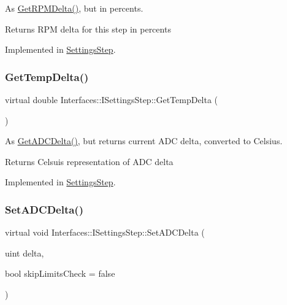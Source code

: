 As \hyperlink{class_interfaces_1_1_i_settings_step_ace758dafae2a6bcbb0b1a3a64c802e3c}{Get\+R\+P\+M\+Delta()}, but in percents. 

\begin{DoxyReturn}{Returns}
R\+PM delta for this step in percents 
\end{DoxyReturn}


Implemented in \hyperlink{class_settings_step_ada359fe4bfdaf271e621ec2943c0644c}{Settings\+Step}.

\mbox{\label{class_interfaces_1_1_i_settings_step_a7dd93517fbd9bc10a54b3b35a2f8bd78}} 
\subsubsection{\texorpdfstring{Get\+Temp\+Delta()}{GetTempDelta()}}
{\footnotesize\ttfamily virtual double Interfaces\+::\+I\+Settings\+Step\+::\+Get\+Temp\+Delta (\begin{DoxyParamCaption}{ }\end{DoxyParamCaption})\hspace{0.3cm}{\ttfamily [pure virtual]}}



As \hyperlink{class_interfaces_1_1_i_settings_step_ab77c6eaa45707ec4932a8f432b13ad78}{Get\+A\+D\+C\+Delta()}, but returns current A\+DC delta, converted to Celsius. 

\begin{DoxyReturn}{Returns}
Celsuis representation of A\+DC delta 
\end{DoxyReturn}


Implemented in \hyperlink{class_settings_step_a8162810e5ce2df99053ac5722acc0901}{Settings\+Step}.

\mbox{\label{class_interfaces_1_1_i_settings_step_a83f00b8b66f6566721065e34e41508c6}} 
\subsubsection{\texorpdfstring{Set\+A\+D\+C\+Delta()}{SetADCDelta()}}
{\footnotesize\ttfamily virtual void Interfaces\+::\+I\+Settings\+Step\+::\+Set\+A\+D\+C\+Delta (\begin{DoxyParamCaption}\item[{uint}]{delta,  }\item[{bool}]{skip\+Limits\+Check = {\ttfamily false} }\end{DoxyParamCaption})\hspace{0.3cm}{\ttfamily [pure virtual]}}



